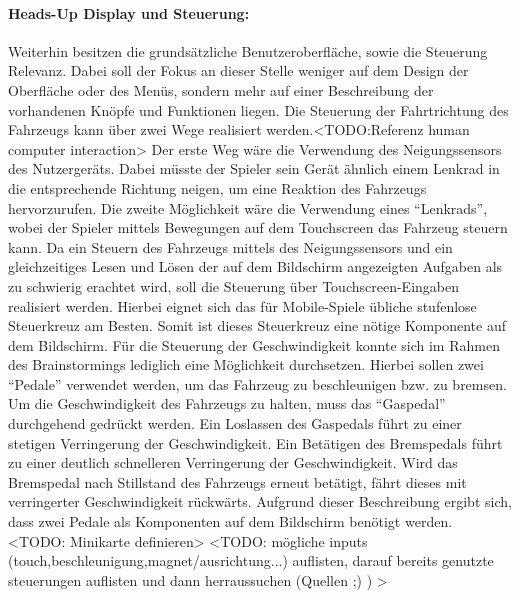 		\paragraph{Heads-Up Display und Steuerung:}
		Weiterhin besitzen die grundsätzliche Benutzeroberfläche, sowie die Steuerung Relevanz. Dabei soll der Fokus an dieser Stelle weniger auf dem Design der Oberfläche oder des Menüs, sondern mehr auf einer Beschreibung der vorhandenen Knöpfe und Funktionen liegen.
		Die Steuerung der Fahrtrichtung des Fahrzeugs kann über zwei Wege realisiert werden.<TODO:Referenz human computer interaction> Der erste Weg wäre die Verwendung des Neigungssensors des Nutzergeräts. Dabei müsste der Spieler sein Gerät ähnlich einem Lenkrad in die entsprechende Richtung neigen, um eine Reaktion des Fahrzeugs hervorzurufen. Die zweite Möglichkeit wäre die Verwendung eines \enquote{Lenkrads}, wobei der Spieler mittels Bewegungen auf dem Touchscreen das Fahrzeug steuern kann. Da ein Steuern des Fahrzeugs mittels des Neigungssensors und ein gleichzeitiges Lesen und Lösen der auf dem Bildschirm angezeigten Aufgaben als zu schwierig erachtet wird, soll die Steuerung über Touchscreen-Eingaben realisiert werden. Hierbei eignet sich das für Mobile-Spiele übliche stufenlose Steuerkreuz am Besten. Somit ist dieses Steuerkreuz eine nötige Komponente auf dem Bildschirm.
		Für die Steuerung der Geschwindigkeit konnte sich im Rahmen des Brainstormings lediglich eine Möglichkeit durchsetzen. Hierbei sollen zwei \enquote{Pedale} verwendet werden, um das Fahrzeug zu beschleunigen bzw. zu bremsen. Um die Geschwindigkeit des Fahrzeugs zu halten, muss das \enquote{Gaspedal} durchgehend gedrückt werden. Ein Loslassen des Gaspedals führt zu einer stetigen Verringerung der Geschwindigkeit. Ein Betätigen des Bremspedals führt zu einer deutlich schnelleren Verringerung der Geschwindigkeit. Wird das Bremspedal nach Stillstand des Fahrzeugs erneut betätigt, fährt dieses mit verringerter Geschwindigkeit rückwärts. Aufgrund dieser Beschreibung ergibt sich, dass zwei Pedale als Komponenten auf dem Bildschirm benötigt werden.
		<TODO: Minikarte definieren>
		<TODO: mögliche inputs (touch,beschleunigung,magnet/ausrichtung...) auflisten, darauf bereits genutzte steuerungen auflisten und dann herraussuchen (Quellen ;) ) >

